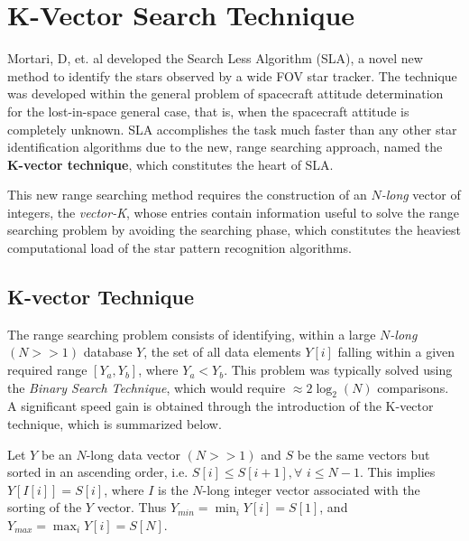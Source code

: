 \documentclass[../../main.tex]{subfiles}
\begin{document}
\section{K-Vector Search Technique}
\label{appendix:k-vector}
\thispagestyle{fancy}

Mortari, D, et. al \cite{mortari2014k} developed the Search Less Algorithm (SLA), a novel new method to identify the stars observed by a wide FOV star tracker. 
The technique was developed within the general problem of spacecraft attitude determination for the lost-in-space general case, that is, when the spacecraft attitude is completely unknown.
SLA accomplishes the task much faster than any other star identification algorithms due to the new, range searching approach, named the \textbf{K-vector technique}, which constitutes the heart of SLA.

This new range searching method requires the construction of an \textit{$N$-long} vector of integers, the \textit{vector-K}, whose entries contain information useful to solve the range searching problem by avoiding the searching phase, which constitutes the heaviest computational load of the star pattern recognition algorithms.


\subsection{K-vector Technique}

The range searching problem consists of identifying, within a large \textit{$N$-long} $(N>>1)$ database $Y$, the set of all data elements $Y[i]$ falling within a given required range $[Y_a, Y_b]$, where $Y_a < Y_b$. This problem was typically solved using the \textit{Binary Search Technique}, which would require $\approx 2\log_2(N)$ comparisons.
A significant speed gain is obtained through the introduction of the K-vector technique, which is summarized below.

Let $Y$ be an $N$-long data vector $(N>>1)$ and $S$ be the same vectors but sorted in an ascending order, i.e. $S[i] \le S[i+1], \forall$ $i \le N-1$. This implies $Y[I[i]] = S[i]$, where $I$ is the $N$-long integer vector associated with the sorting of the $Y$ vector. Thus $Y_{min} = \min_i Y[i] = S[1]$, and $Y_{max} = \max_iY[i]=S[N]$.
\end{document}
